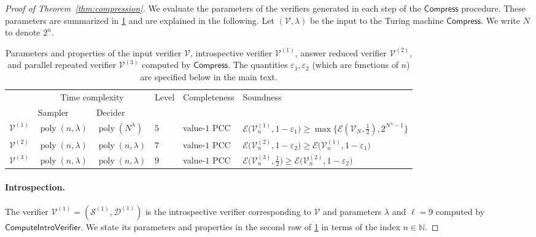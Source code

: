 \documentclass[11pt]{article}
\theoremstyle{definition}
\newcommand{\N}{\ensuremath{\mathbb{N}}}
\DeclareMathOperator{\poly}{poly}
\newcommand{\eps}{\varepsilon}
\newcommand{\sampler}{\mathcal{S}}
\newcommand{\decider}{\mathcal{D}}
\newcommand{\verifier}{\mathcal{V}}
\newcommand{\Ent}{\mathscr{E}}
\newcommand{\tmstyle}[1]{\ensuremath{\mathsf{#1}}}
\newcommand{\Compress}{\tmstyle{Compress}}
\newcommand{\ComputeIntroVerifier}{\tmstyle{ComputeIntroVerifier}}
\begin{document}
\begin{proof}[Proof of Theorem~\ref{thm:compression}]
  We evaluate the parameters of the verifiers generated in each step of the
  $\Compress$ procedure. 
  These parameters are summarized in \cref{tab:params} and are explained in the
  following. Let $(\verifier, \lambda)$ be the input to the Turing machine $\Compress$. We write $N$ to denote $2^n$. 

  \begin{table}[!htb]
    \centering
    \footnotesize
    \vspace{1em}
    \begin{tabularx}{\linewidth}{b{.03\linewidth}m{.1\linewidth}m{.1\linewidth}
      m{.03\linewidth}m{.1\linewidth}m{.5\linewidth}}
    \toprule \multirow{2}[2]{.03\linewidth}{} & \multicolumn{2}{c}{Time
      complexity} & \multirow{2}[2]{.1\linewidth}{Level} &
    \multirow{2}[2]{.1\linewidth}{Completeness}
    & \multirow{2}[2]{.1\linewidth}{Soundness}\\
    \cmidrule(lr){2-3}
    & Sampler & Decider\\
    \midrule $\verifier^{(1)}$ & $\poly(n, \lambda)$ & $\poly(N^\lambda)$ & $5$
    & value-$1$ PCC & $\Ent \big(
    \verifier_n^{(1)}, 1 - \eps_1 \big) \geq \max \big
    \{\Ent(\verifier_N, \frac{1}{2}), 2^{N^\lambda - 1} \big \}$\\
    \midrule $\verifier^{(2)}$ & $\poly(n, \lambda)$ & $\poly(n,
    \lambda)$ & $7$ & value-$1$ PCC &
    $\Ent \bigl(
    \verifier_n^{(2)}, 1 - \eps_2 \bigr) \geq \Ent \bigl(\verifier_n^{(1)}, 1 - \eps_1 \bigr)$\\
    \midrule $\verifier^{(3)}$ & $\poly(n, \lambda)$ & $\poly(n,
    \lambda)$ & $9$ & value-$1$ PCC &
    $\Ent \bigl(
    \verifier_n^{(3)}, \frac{1}{2} \bigr) \geq \Ent \bigl(\verifier_n^{(2)}, 1 - \eps_2 \bigr)$\\
    \bottomrule
    \end{tabularx}
    \caption{Parameters and properties of the input verifier $\verifier$,
      introspective verifier $\verifier^{(1)}$, answer reduced verifier
      $\verifier^{(2)}$, and parallel repeated verifier $\verifier^{(3)}$
      computed by $\Compress$.
      The quantities $\eps_1,\eps_2$ (which are functions of $n$) are specified below in the main text.}
\label{tab:params}
  \end{table}







  
  \paragraph{Introspection.}
  The verifier $\verifier^{(1)} = (\sampler^{(1)}, \decider^{(1)})$ is the
  introspective verifier corresponding to $\verifier$ and parameters $\lambda$
  and $\ell = 9$ computed by $\ComputeIntroVerifier$.
  We state its parameters and properties in the second row of \cref{tab:params}
  in terms of the index $n \in \N$.



\end{proof}
\end{document}
